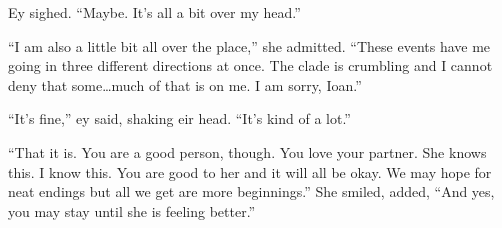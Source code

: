 Ey sighed. ``Maybe. It's all a bit over my head.''

``I am also a little bit all over the place,'' she admitted. ``These events have me going in three different directions at once. The clade is crumbling and I cannot deny that some\ldots much of that is on me. I am sorry, Ioan.''

``It's fine,'' ey said, shaking eir head. ``It's kind of a lot.''

``That it is. You are a good person, though. You love your partner. She knows this. I know this. You are good to her and it will all be okay. We may hope for neat endings but all we get are more beginnings.'' She smiled, added, ``And yes, you may stay until she is feeling better.''
